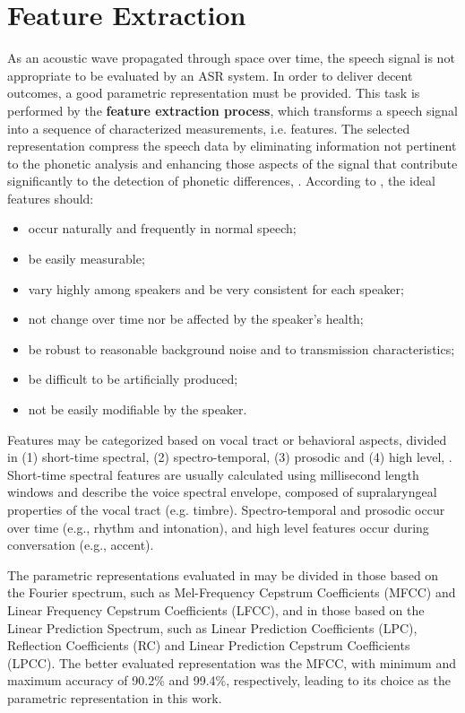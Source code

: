 \chapter{Feature Extraction}
\label{ch:feature-extraction}

As an acoustic wave propagated through space over time, the speech signal is not appropriate to be evaluated by an ASR system. In order to deliver decent outcomes, a good parametric representation must be provided. This task is performed by the \textbf{feature extraction process}, which transforms a speech signal into a sequence of characterized measurements, i.e. features. The selected representation compress the speech data by eliminating information not pertinent to the phonetic analysis and enhancing those aspects of the signal that contribute significantly to the detection of phonetic differences, . According to , the ideal features should:

\begin{itemize}\itemsep0pt
    \item occur naturally and frequently in normal speech;
    \item be easily measurable;
    \item vary highly among speakers and be very consistent for each speaker;
    \item not change over time nor be affected by the speaker's health;
    \item be robust to reasonable background noise and to transmission
    characteristics;
    \item be difficult to be artificially produced;
    \item not be easily modifiable by the speaker.
\end{itemize}

Features may be categorized based on vocal tract or behavioral aspects, divided in (1) short-time spectral, (2) spectro-temporal, (3) prosodic and (4) high level, . Short-time spectral features are usually calculated using millisecond length windows and describe the voice spectral envelope, composed of supralaryngeal properties of the vocal tract (e.g. timbre). Spectro-temporal and prosodic occur over time (e.g., rhythm and intonation), and high level features occur during conversation (e.g., accent).

The parametric representations evaluated in  may be divided in those based on the Fourier spectrum, such as Mel-Frequency Cepstrum Coefficients (MFCC) and Linear Frequency Cepstrum Coefficients (LFCC), and in those based on the Linear Prediction Spectrum, such as Linear Prediction Coefficients (LPC), Reflection Coefficients (RC) and Linear Prediction Cepstrum Coefficients (LPCC). The better evaluated representation was the MFCC, with minimum and maximum accuracy of 90.2\% and 99.4\%, respectively, leading to its choice as the parametric representation in this work.


